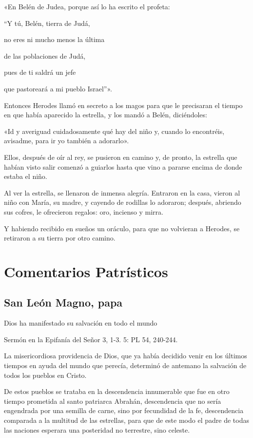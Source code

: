 \begin{body}
\begin{body}
«En Belén de Judea, porque así lo ha escrito el profeta:

``Y tú, Belén, tierra de Judá,

no eres ni mucho menos la última

de las poblaciones de Judá,

pues de ti saldrá un jefe

que pastoreará a mi pueblo Israel''».

Entonces Herodes llamó en secreto a los magos para que le precisaran el
tiempo en que había aparecido la estrella, y los mandó a Belén,
diciéndoles:

«Id y averiguad cuidadosamente qué hay del niño y, cuando lo encontréis,
avisadme, para ir yo también a adorarlo».

Ellos, después de oír al rey, se pusieron en camino y, de pronto, la
estrella que habían visto salir comenzó a guiarlos hasta que vino a
pararse encima de donde estaba el niño.

Al ver la estrella, se llenaron de inmensa alegría. Entraron en la casa,
vieron al niño con María, su madre, y cayendo de rodillas lo adoraron;
después, abriendo sus cofres, le ofrecieron regalos: oro, incienso y
mirra.

Y habiendo recibido en sueños un oráculo, para que no volvieran a
Herodes, se retiraron a su tierra por otro
camino.

\section{Comentarios Patrísticos}

\subsection{San León Magno, papa}

Dios ha manifestado su salvación en todo el mundo

Sermón en la Epifanía del Señor 3, 1-3. 5: PL 54, 240-244.

La misericordiosa providencia de Dios, que ya había decidido venir en los últimos tiempos en ayuda del mundo que perecía, determinó de antemano la salvación de todos los pueblos en Cristo.

De estos pueblos se trataba en la descendencia innumerable que fue en otro tiempo prometida al santo patriarca Abrahán, descendencia que no sería engendrada por una semilla de carne, sino por fecundidad de la fe, descendencia comparada a la multitud de las estrellas, para que de este modo el padre de todas las naciones esperara una posteridad no terrestre, sino celeste.


\end{body}
\end{body}
